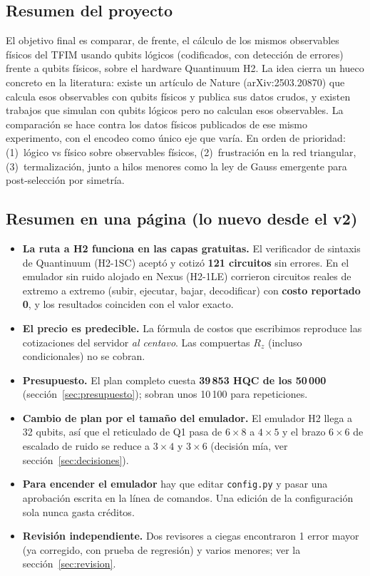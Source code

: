 \documentclass[11pt,a4paper]{article}
\begin{document}
\subsection{Resumen del proyecto}
El objetivo final es comparar, de frente, el c\'alculo de los mismos observables f\'isicos del TFIM
usando qubits l\'ogicos (codificados, con detecci\'on de errores) frente a qubits f\'isicos, sobre el
hardware Quantinuum H2. La idea cierra un hueco concreto en la literatura: existe un art\'iculo de
Nature (arXiv:2503.20870) que calcula esos observables con qubits f\'isicos y publica sus datos
crudos, y existen trabajos que simulan con qubits l\'ogicos pero no calculan esos observables. La
comparaci\'on se hace contra los datos f\'isicos publicados de ese mismo experimento, con el encodeo
como \'unico eje que var\'ia. En orden de prioridad: (1)~l\'ogico vs f\'isico sobre observables f\'isicos,
(2)~frustraci\'on en la red triangular, (3)~termalizaci\'on, junto a hilos menores como la ley de
Gauss emergente para post-selecci\'on por simetr\'ia.

\subsection{Resumen en una p\'agina (lo nuevo desde el v2)}
\begin{itemize}[leftmargin=1.4em]
  \item \textbf{La ruta a H2 funciona en las capas gratuitas.} El verificador de sintaxis de Quantinuum
    (H2-1SC) acept\'o y cotiz\'o \textbf{121 circuitos} sin errores. En el emulador sin ruido alojado en
    Nexus (H2-1LE) corrieron circuitos reales de extremo a extremo (subir, ejecutar, bajar, decodificar)
    con \textbf{costo reportado 0}, y los resultados coinciden con el valor exacto.
  \item \textbf{El precio es predecible.} La f\'ormula de costos que escribimos reproduce las cotizaciones
    del servidor \emph{al centavo}. Las compuertas $R_z$ (incluso condicionales) no se cobran.
  \item \textbf{Presupuesto.} El plan completo cuesta \textbf{39\,853 HQC de los 50\,000}
    (secci\'on~\ref{sec:presupuesto}); sobran unos 10\,100 para repeticiones.
  \item \textbf{Cambio de plan por el tama\~no del emulador.} El emulador H2 llega a 32 qubits, as\'i que
    el reticulado de Q1 pasa de $6{\times}8$ a $4{\times}5$ y el brazo $6{\times}6$ de escalado de ruido se
    reduce a $3{\times}4$ y $3{\times}6$ (decisi\'on m\'ia, ver secci\'on~\ref{sec:decisiones}).
  \item \textbf{Para encender el emulador} hay que editar \texttt{config.py} y pasar una aprobaci\'on
    escrita en la l\'inea de comandos. Una edici\'on de la configuraci\'on sola nunca gasta cr\'editos.
  \item \textbf{Revisi\'on independiente.} Dos revisores a ciegas encontraron 1 error mayor (ya
    corregido, con prueba de regresi\'on) y varios menores; ver la secci\'on~\ref{sec:revision}.
\end{itemize}
\end{document}
